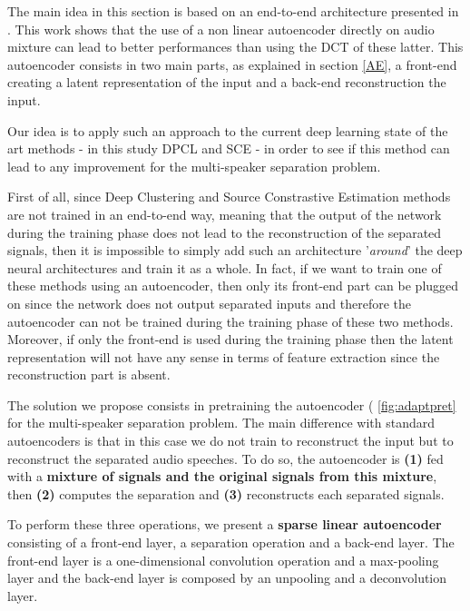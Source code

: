 \documentclass[master, tikz, final,11pt, dvipdfmx]{iscs-thesis}
\begin{document}
The main idea in this section is based on an end-to-end architecture presented in \cite{Adaptive}. This work shows that the use of a non linear autoencoder directly on audio mixture can lead to better performances than using the DCT of these latter. This autoencoder consists in two main parts, as explained in section \ref{AE}, a front-end creating a latent representation of the input and a back-end reconstruction the input.

Our idea is to apply such an approach to the current deep learning state of the art methods - in this study DPCL and SCE - in order to see if this method can lead to any improvement for the multi-speaker separation problem.
 
First of all, since Deep Clustering and Source Constrastive Estimation methods are not trained in an end-to-end way, meaning that the output of the network during the training phase does not lead to the reconstruction of the separated signals, then it is impossible to simply add such an architecture '\textit{around}' the deep neural architectures and train it as a whole. In fact, if we want to train one of these methods using an autoencoder, then only its front-end part can be plugged on since the network does not output separated inputs and therefore the autoencoder can not be trained during the training phase of these two methods. Moreover, if only the front-end is used during the training phase then the latent representation will not have any sense in terms of feature extraction since the reconstruction part is absent. 

The solution we propose consists in pretraining the autoencoder ( \autoref{fig:adaptpret} for the multi-speaker separation problem. The main difference with standard autoencoders is that in this case we do not train to reconstruct the input but to reconstruct the separated audio speeches. To do so, the autoencoder is \textbf{(1)} fed with a \textbf{mixture of signals and the original signals from this mixture}, then \textbf{(2)} computes the separation and \textbf{(3)} reconstructs each separated signals.

To perform these three operations, we present a \textbf{sparse linear autoencoder} consisting of a front-end layer, a separation operation and a back-end layer. The front-end layer is a one-dimensional convolution operation and a max-pooling layer and the back-end layer is composed by an unpooling and a deconvolution layer.
\end{document}
